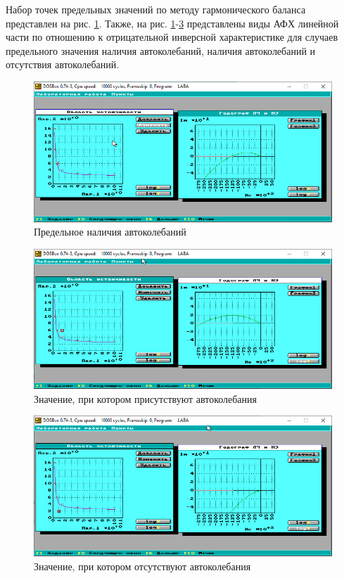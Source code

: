 	Набор точек предельных значений по методу гармонического баланса представлен на рис. \ref{garm1}. Также, на рис. \ref{garm1}-\ref{garm3} представлены виды АФХ линейной части по отношению к отрицательной инверсной характеристике для случаев предельного значения наличия автоколебаний, наличия автоколебаний и отсутствия автоколебаний.
	
	\begin{figure}
		\centering\includegraphics[width=.8\textwidth]{png/4.png}
		\caption{Предельное наличия автоколебаний}
		\label{garm1}
	\end{figure}
	
	\begin{figure}
		\centering\includegraphics[width=.8\textwidth]{png/5.png}
		\caption{Значение, при котором присутствуют автоколебания}
		\label{garm2}
	\end{figure}
	
	\begin{figure}
		\centering\includegraphics[width=.8\textwidth]{png/6.png}
		\caption{Значение, при котором отсутствуют автоколебания}
		\label{garm3}
	\end{figure}
	
